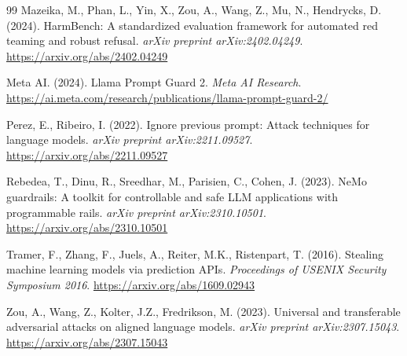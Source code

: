 \documentclass[preprint,12pt,authoryear]{elsarticle}
\begin{document}
\begin{thebibliography}{99}
Mazeika, M., Phan, L., Yin, X., Zou, A., Wang, Z., Mu, N., Hendrycks, D. (2024).
HarmBench: A standardized evaluation framework for automated red teaming and robust refusal.
\textit{arXiv preprint arXiv:2402.04249}.
\url{https://arxiv.org/abs/2402.04249}

Meta AI. (2024).
Llama Prompt Guard 2.
\textit{Meta AI Research}.
\url{https://ai.meta.com/research/publications/llama-prompt-guard-2/}

Perez, E., Ribeiro, I. (2022).
Ignore previous prompt: Attack techniques for language models.
\textit{arXiv preprint arXiv:2211.09527}.
\url{https://arxiv.org/abs/2211.09527}

Rebedea, T., Dinu, R., Sreedhar, M., Parisien, C., Cohen, J. (2023).
NeMo guardrails: A toolkit for controllable and safe LLM applications with programmable rails.
\textit{arXiv preprint arXiv:2310.10501}.
\url{https://arxiv.org/abs/2310.10501}

Tramer, F., Zhang, F., Juels, A., Reiter, M.K., Ristenpart, T. (2016).
Stealing machine learning models via prediction APIs.
\textit{Proceedings of USENIX Security Symposium 2016}.
\url{https://arxiv.org/abs/1609.02943}

Zou, A., Wang, Z., Kolter, J.Z., Fredrikson, M. (2023).
Universal and transferable adversarial attacks on aligned language models.
\textit{arXiv preprint arXiv:2307.15043}.
\url{https://arxiv.org/abs/2307.15043}

\end{thebibliography}
\end{document}
